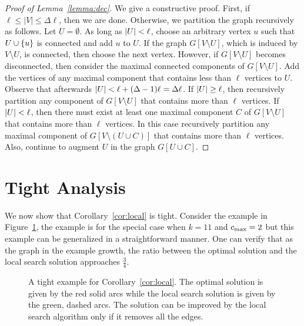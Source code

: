 \newpage

\begin{proof}[Proof of Lemma~\ref{lemma:dec}]
We give a constructive proof.
%
First, if $\ell \leq |V| \leq \Delta \ell$, then we are done.
%
Otherwise, we partition the graph recursively as follows.  Let $U
= \emptyset$.  As long as $\left| U \right| < \ell$, choose an arbitrary vertex
$u$ such that $U \cup \left\{ u \right\}$ is connected and add $u$ to $U$.
%
If the graph $G[V \setminus U]$, which is induced by $V \setminus U$,
is connected, then choose the next vertex.
%
However, if $G[V \setminus U]$ becomes disconnected, then consider the
maximal connected components of $G[V \setminus U]$.  Add the vertices
of any maximal component that contains less than $\ell$ vertices to
$U$.  Observe that afterwards $\left| U \right| < \ell + (\Delta-1) \ell
= \Delta \ell$.
%
If $\left| U \right| \geq \ell$, then recursively partition any component of
$G[V \setminus U]$ that contains more than $\ell$ vertices.
%
If $\left| U \right| < \ell$, then there must exist at least one maximal
component $C$ of $G[V \setminus U]$ that contains more than $\ell$
vertices.  In this case recursively partition any maximal component of
$G[V \setminus (U \cup C)]$ that contains more than $\ell$ vertices.
Also, continue to augment $U$ in the graph $G[U \cup C]$.
\end{proof}





\section{Tight Analysis}
\label{sec:tight}

We now show that Corollary~\ref{cor:local} is tight.  Consider the
example in Figure~\ref{fig:local search tight}, the example is for the
special case when $k = 11$ and $c_{\max} = 2$ but this example can be
generalized in a straightforward manner.  One can verify that as the
graph in the example growth, the ratio between the optimal solution
and the local search solution approaches $\frac{3}{4}$.

\begin{figure}[h]
\begin{center}
\scalebox{.9}{}
\caption{A tight example for Corollary~\ref{cor:local}. 
The optimal solution is given by the red solid arcs while the local
search solution is given by the green, dashed arcs.  The solution can
be improved by the local search algorithm only if it removes all the
edges.}
\label{fig:local search tight}
\end{center}
\end{figure}

